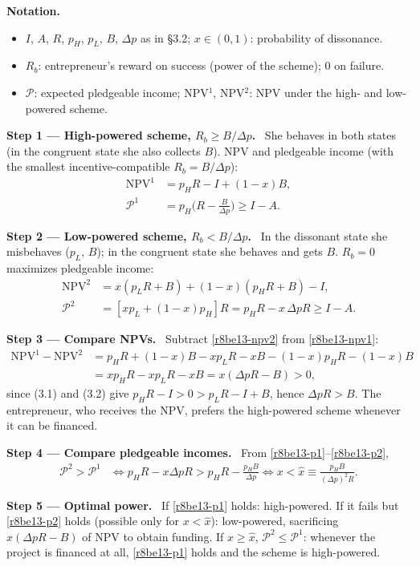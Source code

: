 \documentclass[11pt,a4paper]{article}
\newcommand{\notation}{\par\noindent\textbf{Notation.}}
\newcommand{\step}[2]{\par\medskip\noindent\textbf{Step #1 --- #2.}~}
\newcommand{\dpp}{\Delta p}
\begin{document}
\notation
\begin{itemize}
  \item $I$, $A$, $R$, $p_H$, $p_L$, $B$, $\dpp$ as in \S3.2; $x\in(0,1)$: probability of dissonance.
  \item $R_b$: entrepreneur's reward on success (power of the scheme); 0 on failure.
  \item $\mathcal P$: expected pledgeable income; NPV$^1$, NPV$^2$: NPV under the high- and low-powered scheme.
\end{itemize}

\step{1}{High-powered scheme, $R_b\ge B/\dpp$} She behaves in both states (in the congruent state she also collects $B$). NPV and pledgeable income (with the smallest incentive-compatible $R_b=B/\dpp$):
\begin{align}
  \mathrm{NPV}^1 &= p_HR - I + (1-x)B, \label{r8be13-npv1}\\
  \mathcal P^1 &= p_H\Big(R-\frac{B}{\dpp}\Big) \ge I-A. \label{r8be13-p1}
\end{align}

\step{2}{Low-powered scheme, $R_b<B/\dpp$} In the dissonant state she misbehaves ($p_L$, $B$); in the congruent state she behaves and gets $B$. $R_b=0$ maximizes pledgeable income:
\begin{align}
  \mathrm{NPV}^2 &= x(p_LR+B) + (1-x)(p_HR+B) - I, \label{r8be13-npv2}\\
  \mathcal P^2 &= [xp_L+(1-x)p_H]R = p_HR - x\,\dpp R \ge I-A. \label{r8be13-p2}
\end{align}

\step{3}{Compare NPVs} Subtract \eqref{r8be13-npv2} from \eqref{r8be13-npv1}:
\begin{align}
  \mathrm{NPV}^1-\mathrm{NPV}^2 &= p_HR + (1-x)B - xp_LR - xB - (1-x)p_HR - (1-x)B \nonumber\\
  &= xp_HR - xp_LR - xB = x(\dpp R - B) > 0, \label{r8be13-gap}
\end{align}
since (3.1) and (3.2) give $p_HR-I>0>p_LR-I+B$, hence $\dpp R>B$. The entrepreneur, who receives the NPV, prefers the high-powered scheme whenever it can be financed.

\step{4}{Compare pledgeable incomes} From \eqref{r8be13-p1}--\eqref{r8be13-p2},
\begin{align}
  \mathcal P^2>\mathcal P^1 &\iff p_HR - x\dpp R > p_HR - \frac{p_HB}{\dpp} \iff x < \hat x \equiv \frac{p_HB}{(\dpp)^2R}. \label{r8be13-xhat}
\end{align}

\step{5}{Optimal power} If \eqref{r8be13-p1} holds: high-powered. If it fails but \eqref{r8be13-p2} holds (possible only for $x<\hat x$): low-powered, sacrificing $x(\dpp R-B)$ of NPV to obtain funding. If $x\ge\hat x$, $\mathcal P^2\le\mathcal P^1$: whenever the project is financed at all, \eqref{r8be13-p1} holds and the scheme is high-powered.
\end{document}
